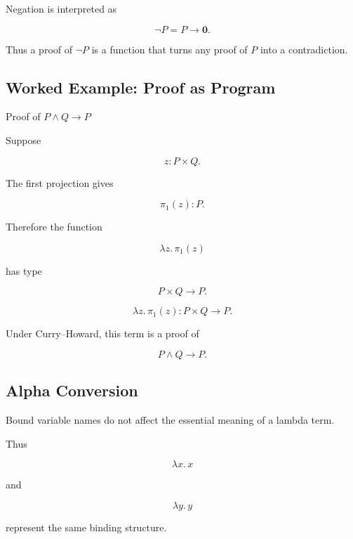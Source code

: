 Negation is interpreted as

\[
\boxed{
\neg P
=
P\to\mathbf{0}.
}
\]

Thus a proof of \(\neg P\) is a function that turns any proof of \(P\) into
a contradiction.

\subsection{Worked Example: Proof as Program}
\label{subsec:worked-proof-as-program}

\begin{workedexamplebox}{Proof of \(P\land Q\rightarrow P\)}

Suppose

\[
z:P\times Q.
\]

The first projection gives

\[
\pi_1(z):P.
\]

Therefore the function

\[
\lambda z.\,\pi_1(z)
\]

has type

\[
P\times Q\to P.
\]

\begin{answerbox}
\[
\boxed{
\lambda z.\,\pi_1(z)
:
P\times Q\to P.
}
\]
\end{answerbox}

Under Curry--Howard, this term is a proof of

\[
P\land Q\rightarrow P.
\]

\end{workedexamplebox}

\subsection{Alpha Conversion}
\label{subsec:alpha-conversion-type-theory}

Bound variable names do not affect the essential meaning of a lambda term.

Thus

\[
\boxed{
\lambda x.\,x
}
\]

and

\[
\boxed{
\lambda y.\,y
}
\]

represent the same binding structure.

